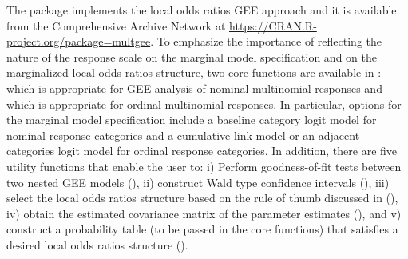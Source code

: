 \documentclass[
]{jss}
\begin{document}
The  \citep{RCoreTeam2013} package  implements
the local odds ratios GEE approach and it is available from the
Comprehensive  Archive Network at
\url{https://CRAN.R-project.org/package=multgee}. To emphasize the
importance of reflecting the nature of the response scale on the
marginal model specification and on the marginalized local odds ratios
structure, two core functions are available in :
 which is appropriate for GEE analysis of nominal
multinomial responses and  which is appropriate for
ordinal multinomial responses. In particular, options for the marginal
model specification include a baseline category logit model for nominal
response categories and a cumulative link model or an adjacent
categories logit model for ordinal response categories. In addition,
there are five utility functions that enable the user to: i) Perform
goodness-of-fit tests between two nested GEE models (), ii)
construct Wald type confidence intervals (), iii) select
the local odds ratios structure based on the rule of thumb discussed in
\citet{Touloumis2012} (), iv) obtain the estimated
covariance matrix of the parameter estimates (), and v)
construct a probability table (to be passed in the core functions) that
satisfies a desired local odds ratios structure ().
\end{document}
